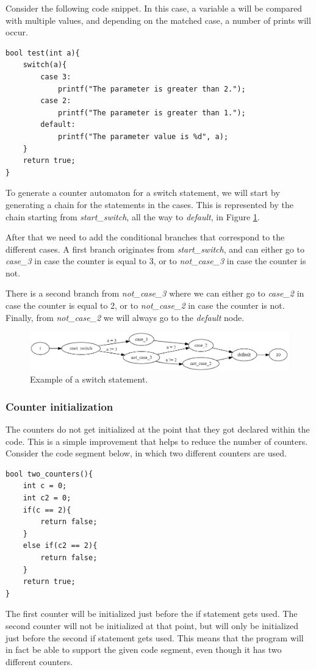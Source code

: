 \documentclass[12pt]{article}
\begin{document}
Consider the following code snippet. In this case, a variable a will be compared with multiple values, and depending on the matched case, a number of prints will occur.

\begin{lstlisting}[style=CStyle]
bool test(int a){
	switch(a){
		case 3:
			printf("The parameter is greater than 2.");
		case 2:
			printf("The parameter is greater than 1.");
		default:
			printf("The parameter value is %d", a);
	}
	return true;
}
\end{lstlisting}

To generate a counter automaton for a switch statement, we will start by generating a chain for the statements in the cases. This is represented by the chain starting from \textit{start\_switch}, all the way to \textit{default}, in Figure \ref{fig:counter_switch}.

After that we need to add the conditional branches that correspond to the different cases. A first branch originates from \textit{start\_switch}, and can either go to \textit{case\_3} in case the counter is equal to 3, or to \textit{not\_case\_3} in case the counter is not.

There is a second branch from \textit{not\_case\_3} where we can either go to \textit{case\_2} in case the counter is equal to 2, or to \textit{not\_case\_2} in case the counter is not. Finally, from \textit{not\_case\_2} we will always go to the \textit{default} node.

\begin{figure}[h]
	\centering
	\includegraphics[width=\linewidth]{counter_switch}
	\caption{Example of a switch statement.}
	\label{fig:counter_switch}
\end{figure}

\subsubsection{Counter initialization}
The counters do not get initialized at the point that they got declared within the code. This is a simple improvement that helps to reduce the number of counters. Consider the code segment below, in which two different counters are used.

\begin{lstlisting}[style=CStyle]
bool two_counters(){
	int c = 0;
	int c2 = 0;
	if(c == 2){
		return false;
	}
	else if(c2 == 2){
		return false;
	}
	return true;
}
\end{lstlisting}
The first counter will be initialized just before the if statement gets used. The second counter will not be initialized at that point, but will only be initialized just before the second if statement gets used. This means that the program will in fact be able to support the given code segment, even though it has two different counters.
\end{document}

